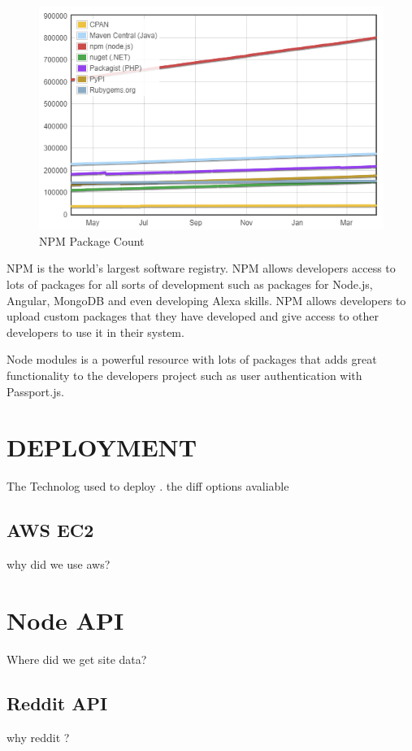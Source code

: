 \begin{figure}[!htb]
  \includegraphics[width=\linewidth]{img/moduleCount.PNG}
  \caption{NPM Package Count}
  \label{fig:NPM}
\end{figure}

NPM is the world’s largest software registry. NPM allows developers access to lots of packages for all sorts of development such as packages for Node.js, Angular, MongoDB and even developing Alexa skills. NPM allows developers to upload custom packages that they have developed and give access to other developers to use it in their system.

Node modules is a powerful resource with lots of packages that adds great functionality to the developers project such as user authentication with Passport.js.


\section{DEPLOYMENT}
The Technolog used to deploy . the diff options avaliable 
\subsection{AWS EC2}
why did we use aws?

\section{Node API}
Where did we get site data?
\subsection{Reddit API}
why reddit ?

